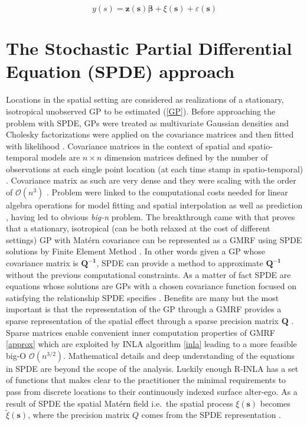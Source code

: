 \documentclass[
  12pt,
  a4paper,
  oneside]{book}
\theoremstyle{definition}
\theoremstyle{definition}
\theoremstyle{definition}
\theoremstyle{remark}
\begin{document}
\[
y(s)=\boldsymbol{z}(\boldsymbol{s}) \boldsymbol{\beta}+\xi(\boldsymbol{s})+\varepsilon(\boldsymbol{s})
\]

\hypertarget{spdeapproach}{%
\section{The Stochastic Partial Differential Equation (SPDE) approach}\label{spdeapproach}}

Locations in the spatial setting are considered as realizations of a stationary, isotropical unobserved GP to be estimated (\ref{GP}). Before approaching the problem with SPDE, GPs were treated as multivariate Gaussian densities and Cholesky factorizations were applied on the covariance matrices and then fitted with likelihood \citep{LecturePaci}. Covariance matrices in the context of spatial and spatio-temporal models \citep{PACI2017149, Cameletti2012} are \(n \times n\) dimension matrices defined by the number of observations at each single point location (at each time stamp in spatio-temporal) \citep{BLANGIARDO201339}. Covariance matrix as such are very dense and they were scaling with the order of \(\mathcal{O}\left(n^{3}\right)\) \citep{Banerjee-Gelfand}. Problem were linked to the computational costs needed for linear algebra operations for model fitting and spatial interpolation as well as prediction \citep{Cameletti2012}, having led to obvious \emph{big-n} problem.
The breakthrough came with \citet{Lindgren2011} that proves that a stationary, isotropical (can be both relaxed at the cost of different settings) GP with Matérn covariance can be represented as a GMRF using SPDE solutions by Finite Element Method \citep{Krainski-Rubio}. In other words given a GP whose covariance matrix is \(\boldsymbol{Q^{-1}}\), SPDE can provide a method to approximate \(\boldsymbol{Q^{-1}}\) without the previous computational constraints. As a matter of fact SPDE are equations whose solutions are GPs with a chosen covariance function focused on satisfying the relationship SPDE specifies \citeyearpar{Krainski-Rubio}.
Benefits are many but the most important is that the representation of the GP through a GMRF provides a sparse representation of the spatial effect through a sparse precision matrix \(\boldsymbol{Q}\) . Sparse matrices enable convenient inner computation properties of GMRF \ref{approx} which are exploited by INLA algorithm \ref{inla} leading to a more feasible big-O \(\mathcal{O}\left(n^{3 / 2}\right)\). Mathematical details and deep understanding of the equations in SPDE are beyond the scope of the analysis. Luckily enough R-INLA has a set of functions that makes clear to the practitioner the minimal requirements to pass from discrete locations to their continuously indexed surface alter-ego.
As a result of SPDE the spatial Matérn field i.e.~the spatial process \(\xi(\boldsymbol{s})\) becomes \(\tilde\xi(\boldsymbol{s})\), where the precision matrix \(Q\) comes from the SPDE representation \citeyearpar{Cameletti2012}.
\end{document}
